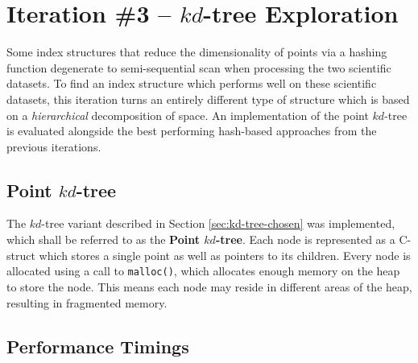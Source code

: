 \section{Iteration \#3 -- $kd$-tree Exploration}

Some index structures that reduce the dimensionality of points via a hashing function degenerate to semi-sequential scan when processing the two scientific datasets. To find an index structure which performs well on these scientific datasets, this iteration turns an entirely different type of structure which is based on a \textit{hierarchical} decomposition of space. An implementation of the point $kd$-tree is evaluated alongside the best performing hash-based approaches from the previous iterations.

\subsection{Point $kd$-tree}

The $kd$-tree variant described in Section \ref{sec:kd-tree-chosen} was implemented, which shall be referred to as the \textbf{Point $kd$-tree}. Each node is represented as a C-struct which stores a single point as well as pointers to its children. Every node is allocated using a call to \texttt{malloc()}, which allocates enough memory on the heap to store the node. This means each node may reside in different areas of the heap, resulting in fragmented memory.

\subsection{Performance Timings}

